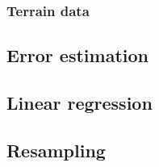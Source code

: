 \subsubsection{Terrain data}

\subsection{Error estimation}


\subsection{Linear regression}



\subsection{Resampling}





